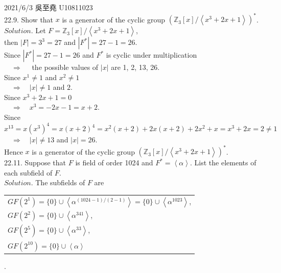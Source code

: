 \documentclass[12pt]{book}
\author{andersonwu2000}
\begin{document}
\begin{CJK}{UTF8}{bsmi}

\hfill 2021/6/3 吳至堯 U10811023 \\

22.9. Show that $x$ is a generator of the cyclic group $(\mathbb{Z}_3[x]/\left\langle x^3+2x+1 \right\rangle)^*$. \\
$Solution$. Let $F=\mathbb{Z}_3[x]/\left\langle x^3+2x+1 \right\rangle$, \\
then $|F|=3^3=27$ and $|F^*|=27-1=26$. \\
Since $|F^*|=27-1=26$ and $F^*$ is cyclic under multiplication \\
$\quad\Rightarrow\quad$ the possible values of $|x|$ are 1, 2, 13, 26. \\
Since $x^1\ne1$ and $x^2\ne1$ \\
$\quad\Rightarrow\quad|x|\ne1$ and $2$. \\
Since $x^3+2x+1=0$ \\
$\quad\Rightarrow\quad x^3=-2x-1=x+2$. \\
Since $x^{13} = x(x^3)^4 = x(x+2)^4 = x^2(x+2)+2x(x+2)+2x^2+x = x^3+2x = 2 \ne 1$ \\
$\quad\Rightarrow\quad|x|\ne13$ and $|x|=26$. \\
Hence $x$ is a generator of the cyclic group $(\mathbb{Z}_3[x]/\left\langle x^3+2x+1 \right\rangle)^*$. \\

22.11. Suppose that $F$ is field of order 1024 and $F^*=\left\langle \alpha \right\rangle$. List the elements of each subfield of $F$. \\
$Solution$. The subfields of $F$ are \\
\begin{tabular}{l}
    $GF(2^1)  
    = \{0\} \cup \left\langle \alpha^{(1024-1)/(2-1)} \right\rangle
    = \{0\} \cup \left\langle \alpha^{1023} \right\rangle$, \\
    $GF(2^2)  = \{0\} \cup \left\langle \alpha^{341} \right\rangle$, \\
    $GF(2^5)  = \{0\} \cup \left\langle \alpha^{33} \right\rangle$, \\
    $GF(2^{10}) = \{0\} \cup \left\langle \alpha \right\rangle$ \\
\end{tabular}. \\

\clearpage


\end{CJK}
\end{document}

